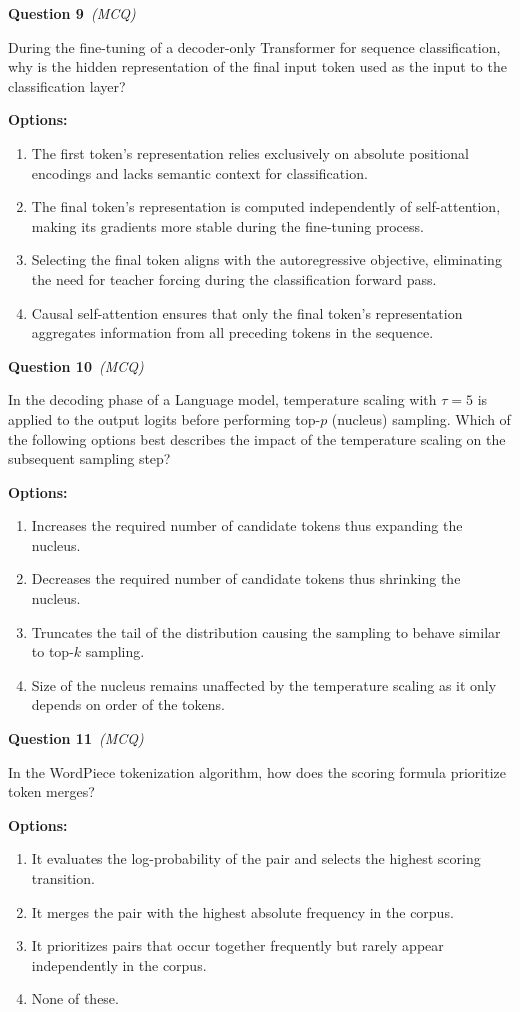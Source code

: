 \documentclass[11pt]{article}
\newcommand{\q}[2]{\vspace{0.5em}\noindent\textbf{Question #1}\if\relax\detokenize{#2}\relax\else\ \textit{(#2)}\fi\par}
\newcommand{\opts}{\textbf{Options:}}
\begin{document}
\q{9}{MCQ}
During the fine-tuning of a decoder-only Transformer for sequence classification, why is the hidden representation of the final input token used as the input to the classification layer?

\opts
\begin{enumerate}[label=(\alph*)]
\item The first token's representation relies exclusively on absolute positional encodings and lacks semantic context for classification.
\item The final token's representation is computed independently of self-attention, making its gradients more stable during the fine-tuning process.
\item Selecting the final token aligns with the autoregressive objective, eliminating the need for teacher forcing during the classification forward pass.
\item Causal self-attention ensures that only the final token's representation aggregates information from all preceding tokens in the sequence.
\end{enumerate}

\q{10}{MCQ}
In the decoding phase of a Language model, temperature scaling with $\tau=5$ is applied to the output logits before performing top-$p$ (nucleus) sampling. Which of the following options best describes the impact of the temperature scaling on the subsequent sampling step?

\opts
\begin{enumerate}[label=(\alph*)]
\item Increases the required number of candidate tokens thus expanding the nucleus.
\item Decreases the required number of candidate tokens thus shrinking the nucleus.
\item Truncates the tail of the distribution causing the sampling to behave similar to top-$k$ sampling.
\item Size of the nucleus remains unaffected by the temperature scaling as it only depends on order of the tokens.
\end{enumerate}

\q{11}{MCQ}
In the WordPiece tokenization algorithm, how does the scoring formula prioritize token merges?

\opts
\begin{enumerate}[label=(\alph*)]
\item It evaluates the log-probability of the pair and selects the highest scoring transition.
\item It merges the pair with the highest absolute frequency in the corpus.
\item It prioritizes pairs that occur together frequently but rarely appear independently in the corpus.
\item None of these.
\end{enumerate}
\end{document}
